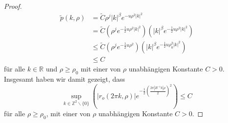 \documentclass[12pt,a4paper]{scrartcl}
\numberwithin{equation}{section}
\newcommand{\R}{\mathbb{R}} %
\newcommand{\Z}{\mathbb{Z}} %
\begin{document}
\begin{proof}
\begin{align*}
\tilde p(k,\rho) &=\widetilde C \rho^j |k|^\beta e^{-u \rho^2 |k|^2}\\
&= \widetilde C \left(\rho^j e^{-\frac{1}{2}u \rho^2 |k|^2} \right) \left(|k|^\beta e^{-\frac{1}{2}u \rho^2 |k|^2} \right) \\
& \leq  \widetilde C \left(\rho^j e^{-\frac{1}{2}u \rho^2} \right) \left(|k|^\beta e^{-\frac{1}{2}u \rho_0^2 |k|^2} \right) \\
&\leq C
\end{align*}
für alle $k \in \R$ und $\rho \geq \rho_0$ mit einer von $\rho$ unabhängigen Konstante $C>0$.
Insgesamt haben wir damit gezeigt, dass
\[
\sup_{k \in \Z^2\backslash \{0\} }
\left(|r_o(2\pi k,\rho)|e^{-\frac{1}{2}\left(\frac{2 \pi |B^{-1}k|\rho}{2}\right)^2} \right) \leq C
\]
für alle $\rho \geq \rho_0$, mit einer von $\rho$ unabhängigen Konstante $C>0$.


\end{proof}
\end{document}

